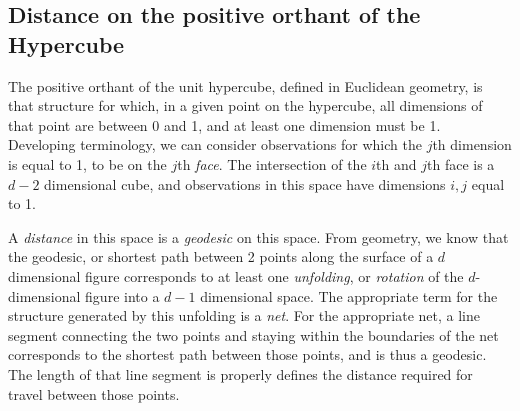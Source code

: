 \subsection{Distance on the positive orthant of the Hypercube}
  \label{subsec:distance}
The positive orthant of the unit hypercube, defined in Euclidean geometry, is that structure for
  which, in a given point on the hypercube, all dimensions of that point are between 0 and 1, and
  at least one dimension must be 1.  Developing terminology, we can consider observations for which
  the $j$th dimension is equal to 1, to be on the $j$th \emph{face}.  The intersection of the $i$th
  and $j$th face is a $d-2$ dimensional cube, and observations in this space have dimensions $i,j$
  equal to 1.

A \emph{distance} in this space is a \emph{geodesic} on this space. From geometry, we know that
  the geodesic, or shortest path between 2 points along the surface of a $d$ dimensional figure
  corresponds to at least one \emph{unfolding}, or \emph{rotation} of the $d$-dimensional
  figure into a $d-1$ dimensional space.  The appropriate term for the structure generated by this
  unfolding is a \emph{net}.  For the appropriate net, a line segment connecting the two points and
  staying within the boundaries of the net corresponds to the shortest path between those points\citep{pappas1989}, and is thus a geodesic.  The length of that line segment is properly
  defines the distance required for travel between those points.

